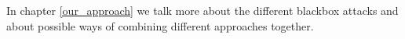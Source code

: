 In chapter \ref{our_approach} we talk more about the different blackbox attacks and about possible ways of combining different approaches together.



